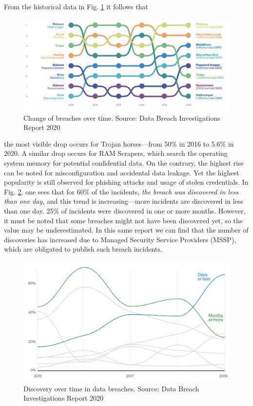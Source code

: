 From the historical data in Fig. \ref{fig:data-breach-historical} it follows that
\begin{figure}[h!]
    \includegraphics[width=1\textwidth]{img/data-breach-historical.png}
    \centering
    \caption{Change of breaches over time. Source: Data Breach Investigations Report 2020 \cite{2020Data0:online}}
    \label{fig:data-breach-historical}
\end{figure} 
the most visible drop occurs for Trojan horses––from 50\% in 2016 to 5.6\% in 2020. A similar drop occurs for RAM Scrapers, which search the operating system memory for potential confidential data. 
On the contrary, the highest rise can be noted for misconfiguration and accidental data leakage. Yet the highest popularity is still observed for phishing attacks and usage of stolen credentials. 
In Fig. \ref{fig:credentials-steal-discovery}, one sees that for 60\% of the incidents, \textit{the breach was discovered in less than one day}, and this trend is increasing––more incidents are discovered in less than one day. 25\% of incidents were discovered in one or more months. However, it must be noted that some breaches might not have been discovered yet, so the value may be underestimated. In this same report we can find that the number of discoveries has increased due to Managed Security Service Providers (MSSP), which are obligated to publish such breach incidents.

\begin{figure}[h!]
    \includegraphics[width=\textwidth]{img/credentials-steal-discovery.png}
    \centering
    \caption{Discovery over time in data breaches. Source: Data Breach Investigations Report 2020 \cite{2020Data0:online}}
    \label{fig:credentials-steal-discovery}
\end{figure} 

